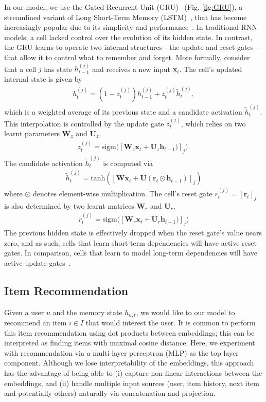 \documentclass{sig-alternate-05-2015}
\newcommand{\mat}[1]{\mathbf{#1}}
\begin{document}
In our model, we use the Gated Recurrent Unit (GRU)~\cite{Cho2014} (Fig. \ref{fig:GRU}), a streamlined variant of Long Short-Term Memory (LSTM)~\cite{Hochreiter1997}, that has become increasingly popular due to its simplicity and performance~\cite{jozefowicz2015empirical}. In traditional RNN models, a cell lacked control over the evolution of its hidden state. In contrast, the GRU learns to operate two internal structures---the update and reset gates---that allow it to control what to remember and forget. More formally, consider that a cell $j$ has state $h_{t-1}^{(j)}$ and receives a new input $\mathbf{x}_t$. The cell's updated internal state is given by
\begin{align}
	h_t^{(j)} = (1-z_t^{(j)})h^{(j)}_{t-1} + z_t^{(j)}\tilde{h}_{t}^{(j)},
\end{align}
which is a weighted average of its previous state and a  candidate activation $\tilde{h}_{t}^{(j)}$. This interpolation is controlled by the update gate $z_t^{(j)}$, which relies on two learnt parameters $\mat{W}_z$ and $\mat{U}_z$,
\begin{align}
	z_t^{(j)} = \textrm{sigm}\big([\mat{W}_z\mat{x}_{t} + \mat{U}_z\mat{h}_{t-1})]_j\big).
\end{align}
The candidate activation $\tilde{h}_{t}^{(j)}$ is computed via
\begin{align}
	\tilde{h}_{t}^{(j)} = \mathrm{tanh}([\mat{W}\mat{x}_t + \mat{U}(\mat{r}_t \odot \mat{h}_{t-1})]_j )
\end{align}
where $\odot$ denotes element-wise multiplication. The cell's reset gate $r^{(j)}_t = [\mat{r}_t]_j$ is also determined by two learnt matrices $\mat{W}_r$ and $\mat{U}_r$,
\begin{align}
	r^{(j)}_t = \textrm{sigm}\big([\mat{W}_r\mat{x}_{t} + \mat{U}_r\mat{h}_{t-1})]_j\big)
\end{align}
The previous hidden state is effectively dropped when the reset gate's value nears zero, and as such, cells that learn short-term dependencies will have active reset gates. In comparison, cells that learn to model long-term dependencies will have active update gates~\cite{Cho2014}. 

\subsection{Item Recommendation}
Given a user $u$ and the memory state $h_{u,t}$, we would like to  our model to recommend an item $i \in I$ that would interest the user. It is common to perform this item recommendation using dot products between embeddings; this can be interpreted as finding items with maximal cosine distance. Here, we experiment with recommendation via a multi-layer perceptron (MLP) as the top layer component. Although we lose interpretability of the embeddings, this approach has the advantage of being able to (i) capture non-linear interactions between the embeddings, and (ii) handle multiple input sources (user, item history, next item and potentially others) naturally via concatenation and projection. 
   
\end{document}
